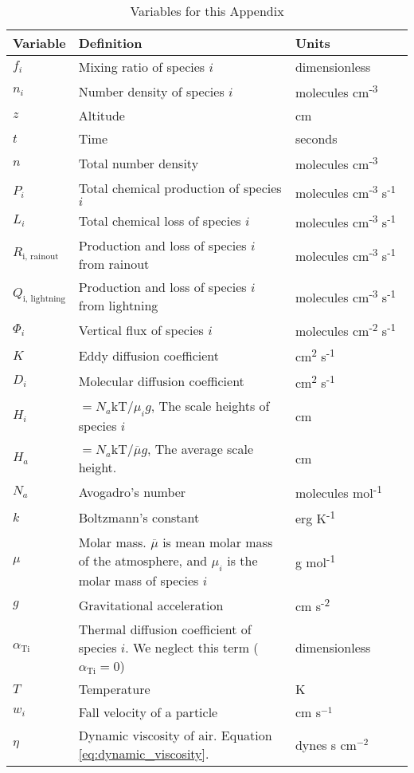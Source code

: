 \begin{table}
  \centering
  \begin{tabularx}{\linewidth}{p{0.15\linewidth} | p{0.55\linewidth} | p{0.3\linewidth}} \caption{Variables for this Appendix} \label{tab:variables} \\
  \hline \hline
  Variable & Definition & Units \\
  \hline
  \(f_{i}\) & Mixing ratio of species \(i\) & dimensionless \\
  \(n_{i}\) & Number density of species \(i\) & molecules
  cm\textsuperscript{-3} \\
  \(z\) & Altitude & cm \\
  \(t\) & Time & seconds \\
  \(n\) & Total number density & molecules
  cm\textsuperscript{-3} \\
  \(P_{i}\) & Total chemical production of species \(i\) & molecules
  cm\textsuperscript{-3} s\textsuperscript{-1} \\
  \(L_{i}\) & Total chemical loss of species \(i\) & molecules
  cm\textsuperscript{-3} s\textsuperscript{-1} \\
  \(R_{\text{i, rainout}}\) & Production and loss of species \(i\) from
  rainout & molecules cm\textsuperscript{-3}
  s\textsuperscript{-1} \\
  \(Q_{\text{i, lightning}}\) & Production and loss of species \(i\)
  from lightning & molecules cm\textsuperscript{-3}
  s\textsuperscript{-1} \\
  \(\Phi_{i}\) & Vertical flux of species \(i\) & molecules
  cm\textsuperscript{-2} s\textsuperscript{-1} \\
  \(K\) & Eddy diffusion coefficient & cm\textsuperscript{2}
  s\textsuperscript{-1} \\
  \(D_{i}\) & Molecular diffusion coefficient & cm\textsuperscript{2}
  s\textsuperscript{-1} \\
  \(H_{i}\) & \(= N_{a}\text{kT}\text{/}\mu_{i}g\), The scale heights of
  species \(i\) & cm \\
  \(H_{a}\) & \(= N_{a}\text{kT}\text{/}\overline{\mu}g\), The average
  scale height. & cm \\
  \(N_{a}\) & Avogadro's number & molecules
  mol\textsuperscript{-1} \\
  \(k\) & Boltzmann's constant & erg K\textsuperscript{-1} \\
  \(\mu\) & Molar mass. \(\overline{\mu}\) is mean molar mass of the
  atmosphere, and \(\mu_{i}\) is the molar mass of species \(i\) & g
  mol\textsuperscript{-1} \\
  \(g\) & Gravitational acceleration & cm
  s\textsuperscript{-2} \\
  \(\alpha_{\text{Ti}}\) & Thermal diffusion coefficient of species \(i\).
  We neglect this term (\(\alpha_{\text{Ti}} = 0\)) &
  dimensionless \\
  \(T\) & Temperature & K \\
  $w_i$ & Fall velocity of a particle & cm s$^{-1}$ \\
  $\eta$ & Dynamic viscosity of air. Equation \eqref{eq:dynamic_viscosity}. & dynes s cm$^{-2}$ \\
  \end{tabularx}
\end{table}